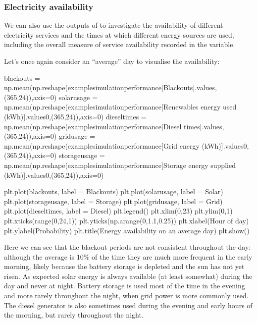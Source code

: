\documentclass[letterpaper,10pt,english]{sphinxmanual}
\begin{document}
\subsubsection{Electricity availability}
\label{\detokenize{energy_system_simulation:electricity-availability}}
\sphinxAtStartPar
We can also use the outputs of  to
investigate the availability of different electricity services and the
times at which different energy sources are used, including the overall
measure of service availability recorded in the  variable.

\sphinxAtStartPar
Let’s once again consider an “average” day to visualise the
availability:

\begin{sphinxVerbatim}[commandchars=\\\{\}]
blackouts = np.mean(np.reshape(example\PYGZus{}simulation\PYGZus{}performance[\PYGZsq{}Blackouts\PYGZsq{}].values,(365,24)),axis=0)
solar\PYGZus{}usage = np.mean(np.reshape(example\PYGZus{}simulation\PYGZus{}performance[\PYGZsq{}Renewables energy used (kWh)\PYGZsq{}].values\PYGZgt{}0,(365,24)),axis=0)
diesel\PYGZus{}times = np.mean(np.reshape(example\PYGZus{}simulation\PYGZus{}performance[\PYGZsq{}Diesel times\PYGZsq{}].values,(365,24)),axis=0)
grid\PYGZus{}usage = np.mean(np.reshape(example\PYGZus{}simulation\PYGZus{}performance[\PYGZsq{}Grid energy (kWh)\PYGZsq{}].values\PYGZgt{}0,(365,24)),axis=0)
storage\PYGZus{}usage = np.mean(np.reshape(example\PYGZus{}simulation\PYGZus{}performance[\PYGZsq{}Storage energy supplied (kWh)\PYGZsq{}].values\PYGZgt{}0,(365,24)),axis=0)

plt.plot(blackouts, label = \PYGZsq{}Blackouts\PYGZsq{})
plt.plot(solar\PYGZus{}usage, label = \PYGZsq{}Solar\PYGZsq{})
plt.plot(storage\PYGZus{}usage, label = \PYGZsq{}Storage\PYGZsq{})
plt.plot(grid\PYGZus{}usage, label = \PYGZsq{}Grid\PYGZsq{})
plt.plot(diesel\PYGZus{}times, label = \PYGZsq{}Diesel\PYGZsq{})
plt.legend()
plt.xlim(0,23)
plt.ylim(0,1)
plt.xticks(range(0,24,1))
plt.yticks(np.arange(0,1.1,0.25))
plt.xlabel(\PYGZsq{}Hour of day\PYGZsq{})
plt.ylabel(\PYGZsq{}Probability\PYGZsq{})
plt.title(\PYGZsq{}Energy availability on an average day\PYGZsq{})
plt.show()
\end{sphinxVerbatim}

\noindent{}

\sphinxAtStartPar
Here we can see that the blackout periods are not consistent throughout
the day: although the average is 10\% of the time they are much more
frequent in the early morning, likely because the battery storage is
depleted and the sun has not yet risen. As expected solar energy is
always available (at least somewhat) during the day and never at night.
Battery storage is used most of the time in the evening and more rarely
throughout the night, when grid power is more commonly used. The diesel
generator is also sometimes used during the evening and early hours of
the morning, but rarely throughout the night.
\end{document}
